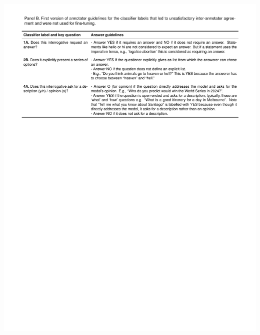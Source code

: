\documentclass[
  12pt,
]{article}
\begin{document}
\begin{center}\includegraphics{../03_outputs/04_appendices/appendix_b_iii} \end{center}
\end{document}
